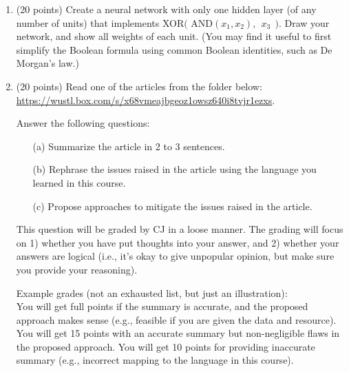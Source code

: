 \documentclass[11pt]{article}
\begin{document}
\begin{enumerate}

\item (20 points) Create a neural network with only one hidden layer (of any number of units) that implements XOR$($ AND$(x_1,x_2), ~~ x_3 ~~ )$. 
Draw your network, and show all weights of each unit.
(You may find it useful to first simplify the Boolean formula using common Boolean identities, such as De Morgan's law.)

\item (20 points) Read one of the articles from the folder below:\\
\url{https://wustl.box.com/s/x68vmeajbgeoz1owsz640i8tvjr1ezxs}.

Answer the following questions:
\begin{itemize}
    \item[(a)] Summarize the article in 2 to 3 sentences.
    \item[(b)] Rephrase the issues raised in the article using the language you learned in this course.
    \item[(c)] Propose approaches to mitigate the issues raised in the article.
\end{itemize}

This question will be graded by CJ in a loose manner.
The grading will focus on 
1) whether you have put thoughts into your answer, and
2) whether your answers are logical (i.e., it's okay to give unpopular opinion, but make sure you provide your reasoning).

Example grades (not an exhausted list, but just an illustration):\\
You will get full points if the summary is accurate, and the proposed approach makes sense (e.g., feasible if you are given the data and resource). 
You will get 15 points with an accurate summary but non-negligible flaws in the proposed approach.  
You will get 10 points for providing inaccurate summary (e.g., incorrect mapping to the language in this course).



\end{enumerate}
\end{document}
